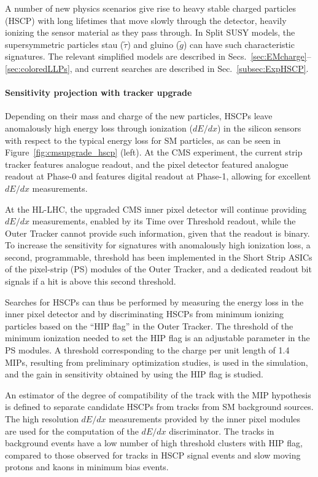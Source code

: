 A number of new physics scenarios give rise to heavy stable charged particles (HSCP) with long lifetimes that move slowly through the detector, heavily
ionizing the sensor material as they pass through. 
In Split SUSY models, the supersymmetric particles stau ($\tilde{\tau}$) and gluino ($\tilde{g}$) can have such characteristic signatures. The relevant simplified models are described in Secs.~\ref{sec:EMcharge}--\ref{sec:coloredLLPs}, and current searches are described in Sec.~\ref{subsec:ExpHSCP}.

\paragraph{Sensitivity projection with tracker upgrade} 

Depending on their mass and charge of the new particles, HSCPs leave anomalously high energy loss through ionization ($dE/dx$) in the silicon sensors with respect to the typical energy loss for SM particles, as can be seen in Figure~\ref{fig:cmsupgrade_hscp} (left).
At the CMS experiment, the current strip tracker features analogue readout, and the pixel detector featured analogue
readout at Phase-0 and features digital readout at Phase-1, allowing for excellent $dE/dx$ measurements.

At the HL-LHC, the upgraded CMS inner pixel detector will continue providing $dE/dx$ measurements, enabled
by its Time over Threshold readout, while the Outer Tracker cannot provide such information, given that the readout is binary. 
To increase the sensitivity for signatures with anomalously high ionization loss, a second, programmable, threshold has been implemented in the Short
Strip ASICs of the pixel-strip (PS) modules of the Outer Tracker, and a dedicated readout bit signals if a
hit is above this second threshold.  

Searches for HSCPs can thus be performed by measuring the energy loss in the inner pixel detector and by
discriminating HSCPs from minimum ionizing particles based on the ``HIP flag'' in the Outer
Tracker. The threshold of the minimum ionization needed to set the HIP flag is an adjustable
parameter in the PS modules. A threshold corresponding to the charge per unit length of 1.4
MIPs, resulting from preliminary optimization studies, is used in the simulation, and the gain
in sensitivity obtained by using the HIP flag is studied.

An estimator of the degree of compatibility of the track with the MIP hypothesis is defined
to separate candidate HSCPs from tracks from SM background sources. The high resolution
$dE/dx$ measurements provided by the inner pixel modules are used for the computation of
the $dE/dx$ discriminator. 
The tracks in background events have a low number of high threshold clusters with HIP flag, compared to those observed for
tracks in HSCP signal events and slow moving protons and kaons in minimum bias events.

